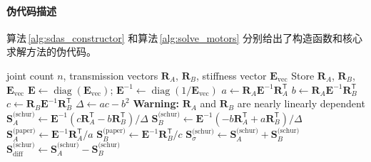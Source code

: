 \paragraph{伪代码描述}

算法\,\ref{alg:sdas_constructor} 和算法\,\ref{alg:solve_motors} 分别给出了构造函数和核心求解方法的伪代码。

\begin{algorithm}[htbp]
\caption{\texttt{SDASModel} 构造函数的预计算逻辑}
\label{alg:sdas_constructor}
\begin{algorithmic}[1]
\Require joint count $n$, transmission vectors $\mathbf{R}_A$, $\mathbf{R}_B$, stiffness vector $\mathbf{E}_{\text{vec}}$
\State Store $\mathbf{R}_A$, $\mathbf{R}_B$, $\mathbf{E}_{\text{vec}}$
\State $\mathbf{E} \gets \operatorname{diag}(\mathbf{E}_{\text{vec}})$; $\mathbf{E}^{-1} \gets \operatorname{diag}(1/\mathbf{E}_{\text{vec}})$
\State $a \gets \mathbf{R}_A \mathbf{E}^{-1} \mathbf{R}_A^{\mathsf{T}}$
\State $b \gets \mathbf{R}_A \mathbf{E}^{-1} \mathbf{R}_B^{\mathsf{T}}$
\State $c \gets \mathbf{R}_B \mathbf{E}^{-1} \mathbf{R}_B^{\mathsf{T}}$
\State $\Delta \gets ac - b^2$
    \State \textbf{Warning:} $\mathbf{R}_A$ and $\mathbf{R}_B$ are nearly linearly dependent
\EndIf
\State $\mathbf{S}_A^{\text{(schur)}} \gets \mathbf{E}^{-1}(c \mathbf{R}_A^{\mathsf{T}} - b \mathbf{R}_B^{\mathsf{T}}) / \Delta$
\State $\mathbf{S}_B^{\text{(schur)}} \gets \mathbf{E}^{-1}(-b \mathbf{R}_A^{\mathsf{T}} + a \mathbf{R}_B^{\mathsf{T}}) / \Delta$
\State $\mathbf{S}_A^{\text{(paper)}} \gets \mathbf{E}^{-1} \mathbf{R}_A^{\mathsf{T}} / a$
\State $\mathbf{S}_B^{\text{(paper)}} \gets \mathbf{E}^{-1} \mathbf{R}_B^{\mathsf{T}} / c$
\State $\mathbf{S}_{\sigma}^{\text{(schur)}} \gets \mathbf{S}_A^{\text{(schur)}} + \mathbf{S}_B^{\text{(schur)}}$
\State $\mathbf{S}_{\text{diff}}^{\text{(schur)}} \gets \mathbf{S}_A^{\text{(schur)}} - \mathbf{S}_B^{\text{(schur)}}$
\State \Return
\end{algorithmic}
\end{algorithm}

